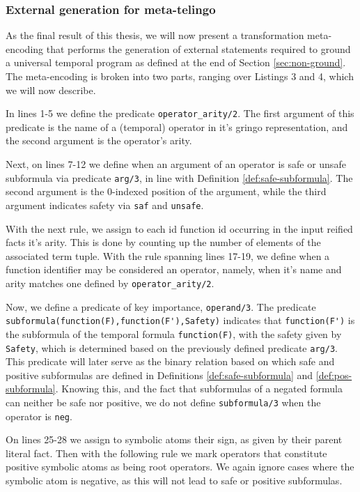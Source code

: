 \subsubsection{External generation for meta-telingo}

As the final result of this thesis, we will now present a
transformation meta-encoding that performs the generation of external
statements required to ground a universal temporal program as defined
at the end of Section \ref{sec:non-ground}. The meta-encoding is
broken into two parts, ranging over Listings 3 and 4, which we will
now describe.

In lines 1-5 we define the predicate \verb|operator_arity/2|. The
first argument of this predicate is the name of a (temporal) operator in
it's gringo representation, and the second argument is the operator's
arity.

Next, on lines 7-12 we define when an argument of an operator is safe
or unsafe subformula via predicate \verb|arg/3|, in line with
Definition \ref{def:safe-subformula}. The second argument is the
0-indexed position of the argument, while the third argument indicates
safety via \verb|saf| and \verb|unsafe|.

With the next rule, we assign to each id function id occurring in the
input reified facts it's arity. This is done by counting up the number
of elements of the associated term tuple. With the rule spanning lines
17-19, we define when a function identifier may be considered an operator,
namely, when it's name and arity matches one defined by
\verb|operator_arity/2|.

Now, we define a predicate of key importance, \verb|operand/3|. The
predicate \verb|subformula(function(F),function(F'),Safety)| indicates
that \verb|function(F')| is the subformula of the temporal formula
\verb|function(F)|, with the safety given by \verb|Safety|, which is
determined based on the previously defined predicate
\verb|arg/3|. This predicate will later serve as the binary relation
based on which safe and positive subformulas are defined in
Definitions \ref{def:safe-subformula} and
\ref{def:pos-subformula}. Knowing this, and the fact that subformulas
of a negated formula can neither be safe nor positive, we do not
define \verb|subformula/3| when the operator is \verb|neg|.

On lines 25-28 we assign to symbolic atoms their sign, as given by
their parent literal fact. Then with the following rule we mark
operators that constitute positive symbolic atoms as being root
operators. We again ignore cases where the symbolic atom is negative,
as this will not lead to safe or positive subformulas.

